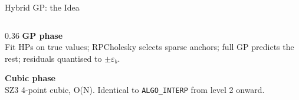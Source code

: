 \documentclass[aspectratio=169, 10pt]{beamer}
\begin{document}
\begin{frame}{Hybrid GP: the Idea}
\begin{columns}[T, totalwidth=\textwidth]
  \begin{column}{0.36\textwidth}
    {\footnotesize\bfseries\color{cteal} GP phase}\\[3pt]
    {\footnotesize Fit HPs on true values; RPCholesky selects sparse
    anchors; full GP predicts the rest; residuals quantised to
    $\pm\varepsilon_b$.}

    \medskip
    {\footnotesize\bfseries\color{camber} Cubic phase}\\[3pt]
    {\footnotesize SZ3 4-point cubic, O(N). Identical to
    \texttt{ALGO\_INTERP} from level 2 onward.}
  \end{column}

\end{columns}
\end{frame}

\end{document}
